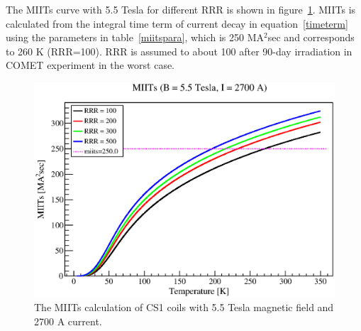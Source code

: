 The MIITs curve with 5.5 Tesla for different RRR is shown in figure~\ref{4miits}.
MIITs is calculated from the integral time term of current decay in equation~\ref{timeterm} using the parameters in table~\ref{miitspara}, which is 250 MA$^2$sec and corresponds to 260 K (RRR=100).
RRR is assumed to about 100 after 90-day irradiation in COMET experiment in the worst case.
  \begin{figure}[H]
   \centering
   \includegraphics[scale=0.48]{chapter5/fig/I2700.eps}
   \caption{ The MIITs calculation of CS1 coils with 5.5 Tesla magnetic field and 2700 A current.}
   \label{4miits}
  \end{figure}

